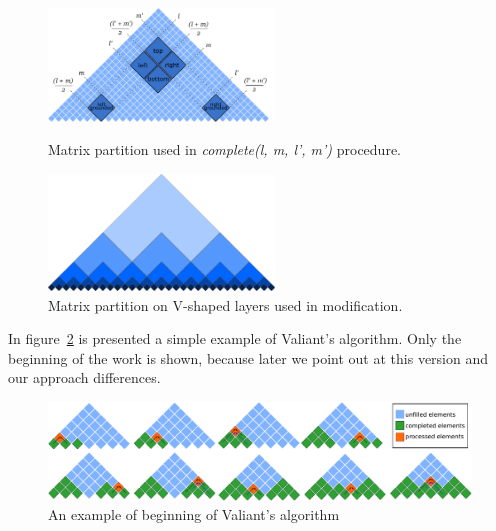 \begin{figure}[h]
\vspace{3mm}
 \begin{center}
    \begin{minipage}{0.48\textwidth}
        \centering
        \includegraphics[width=6cm]{pictures/splitting_with_grounded.pdf}
        \caption{Matrix partition used in \textit{complete(l, m, l', m')} procedure.}
        \label{fig1}
    \end{minipage}\hfill
    \begin{minipage}{0.48\textwidth}
        \centering
        \includegraphics[width=6cm]{pictures/layers.pdf}
        \caption{Matrix partition on V-shaped layers used in modification.}
        \label{fig2}
    \end{minipage}
 \end{center}
\vspace{-8mm}
\end{figure}

In figure~\ref{fig3} is presented a simple example of Valiant's algorithm. Only the beginning of the work is shown, because later we point out at this version and our approach differences. 

\begin{figure}[h]
\vspace{3mm}
 \begin{center}
 \includegraphics[width=12cm]{pictures/valbeg2.pdf}
    \caption{An example of beginning of Valiant's algorithm}
    \label{fig3}
\end{center}
\vspace{-8mm}
\end{figure}